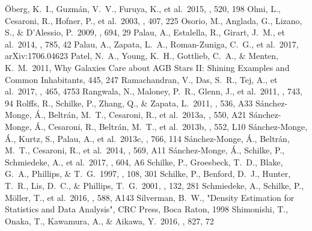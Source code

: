 \documentclass{aa}
\begin{document}
\begin{thebibliography}{}
 {\"O}berg, K.~I., Guzm{\'a}n, V.~V., Furuya, K., et al.\ 2015, \nat, 520, 198 
 Olmi, L., Cesaroni, R., Hofner, P., et al.\ 2003, \aap, 407, 225 
 Osorio, M., Anglada, G., Lizano, S., \& D'Alessio, P.\ 2009, \apj, 694, 29 
 Palau, A., Estalella, R., Girart, J.~M., et al.\ 2014, \apj, 785, 42 
 Palau, A., Zapata, L.~A., Roman-Zuniga, C.~G., et al.\ 2017, arXiv:1706.04623 
 Patel, N.~A., Young, K.~H., Gottlieb, C.~A., \& Menten, K.~M.\ 2011, Why Galaxies Care about AGB Stars II: Shining Examples and Common Inhabitants, 445, 247 
 Ramachandran, V., Das, S.~R., Tej, A., et al.\ 2017, \mnras, 465, 4753 
 Rangwala, N., Maloney, P.~R., Glenn, J., et al.\ 2011, \apj, 743, 94 
 Rolffs, R., Schilke, P., Zhang, Q., \& Zapata, L.\ 2011, \aap, 536, A33 
 S{\'a}nchez-Monge, {\'A}., Beltr{\'a}n, M.~T., Cesaroni, R., et al.\ 2013a, \aap, 550, A21 
 S{\'a}nchez-Monge, {\'A}., Cesaroni, R., Beltr{\'a}n, M.~T., et al.\ 2013b, \aap, 552, L10 
 S{\'a}nchez-Monge, {\'A}., Kurtz, S., Palau, A., et al.\ 2013c, \apj, 766, 114 
 S{\'a}nchez-Monge, {\'A}., Beltr{\'a}n, M.~T., Cesaroni, R., et al.\ 2014, \aap, 569, A11 
 S{\'a}nchez-Monge, {\'A}., Schilke, P., Schmiedeke, A., et al.\ 2017, \aap, 604, A6 
 Schilke, P., Groesbeck, T.~D., Blake, G.~A., Phillips, \& T.~G.\ 1997, \apjs, 108, 301 
 Schilke, P., Benford, D.~J., Hunter, T.~R., Lis, D.~C., \& Phillips, T.~G.\ 2001, \apjs, 132, 281 
 Schmiedeke, A., Schilke, P., M{\"o}ller, T., et al.\ 2016, \aap, 588, A143 
 Silverman, B.~W., "Density Estimation for Statistics and Data Analysis", CRC Press, Boca Raton, 1998 
 Shimonishi, T., Onaka, T., Kawamura, A., \& Aikawa, Y.\ 2016, \apj, 827, 72 

\end{thebibliography}
\end{document}
